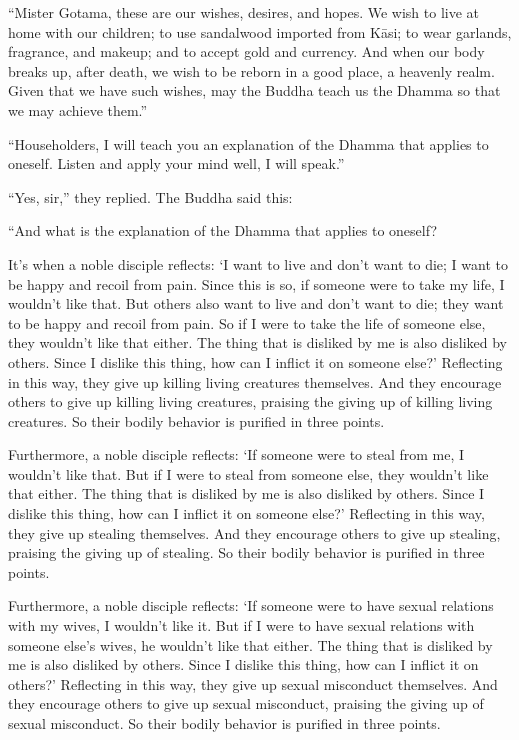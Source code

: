 \documentclass[12pt,openany]{book}%
\begin{document}
“Mister Gotama, these are our wishes, desires, and hopes. We wish to live at home with our children; to use sandalwood imported from \textsanskrit{Kāsi}; to wear garlands, fragrance, and makeup; and to accept gold and currency. And when our body breaks up, after death, we wish to be reborn in a good place, a heavenly realm. Given that we have such wishes, may the Buddha teach us the Dhamma so that we may achieve them.” 

“Householders, I will teach you an explanation of the Dhamma that applies to oneself. Listen and apply your mind well, I will speak.” 

“Yes, sir,” they replied. The Buddha said this: 

“And what is the explanation of the Dhamma that applies to oneself? 

It’s when a noble disciple reflects: ‘I want to live and don’t want to die; I want to be happy and recoil from pain. Since this is so, if someone were to take my life, I wouldn’t like that. But others also want to live and don’t want to die; they want to be happy and recoil from pain. So if I were to take the life of someone else, they wouldn’t like that either. The thing that is disliked by me is also disliked by others. Since I dislike this thing, how can I inflict it on someone else?’ Reflecting in this way, they give up killing living creatures themselves. And they encourage others to give up killing living creatures, praising the giving up of killing living creatures. So their bodily behavior is purified in three points. 

Furthermore, a noble disciple reflects: ‘If someone were to steal from me, I wouldn’t like that. But if I were to steal from someone else, they wouldn’t like that either. The thing that is disliked by me is also disliked by others. Since I dislike this thing, how can I inflict it on someone else?’ Reflecting in this way, they give up stealing themselves. And they encourage others to give up stealing, praising the giving up of stealing. So their bodily behavior is purified in three points. 

Furthermore, a noble disciple reflects: ‘If someone were to have sexual relations with my wives, I wouldn’t like it. But if I were to have sexual relations with someone else’s wives, he wouldn’t like that either. The thing that is disliked by me is also disliked by others. Since I dislike this thing, how can I inflict it on others?’ Reflecting in this way, they give up sexual misconduct themselves. And they encourage others to give up sexual misconduct, praising the giving up of sexual misconduct. So their bodily behavior is purified in three points. 
\end{document}
